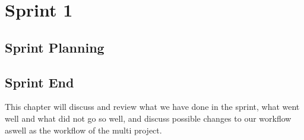 \part{Sprint 1}
\chapter{Sprint Planning}


\chapter{Sprint End}
This chapter will discuss and review what we have done in the sprint, what went well and what did not go so well, and discuss possible changes to our workflow aswell as the workflow of the multi project.





